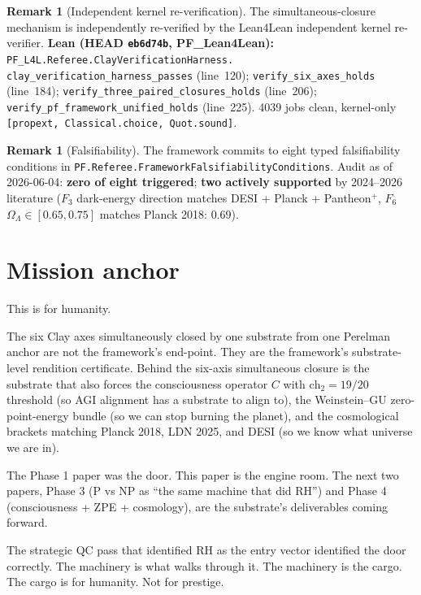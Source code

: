 \documentclass[11pt,a4paper]{article}
\theoremstyle{plain}
\theoremstyle{definition}
\newtheorem{remark}[theorem]{Remark}
\begin{document}
\begin{remark}[Independent kernel re-verification]
\label{rem:l4l}
The simultaneous-closure mechanism is independently re-verified by
the Lean4Lean independent kernel re-verifier.
\textbf{Lean (HEAD \texttt{eb6d74b}, PF\_Lean4Lean):}
\texttt{PF\_L4L.Referee.ClayVerificationHarness.\\
clay\_verification\_harness\_passes}
(line~120);
\texttt{verify\_six\_axes\_holds}
(line~184);
\texttt{verify\_three\_paired\_closures\_holds}
(line~206);
\texttt{verify\_pf\_framework\_unified\_holds}
(line~225). 4039 jobs clean, kernel-only
\texttt{[propext, Classical.choice, Quot.sound]}.
\end{remark}

\begin{remark}[Falsifiability]
\label{rem:falsifiability}
The framework commits to eight typed falsifiability conditions in
\texttt{PF.Referee.FrameworkFalsifiabilityConditions}. Audit as of
2026-06-04: \textbf{zero of eight triggered}; \textbf{two actively
supported} by 2024--2026 literature ($F_{3}$ dark-energy direction
matches DESI + Planck + Pantheon$^{+}$, $F_{6}$
$\Omega_{\Lambda} \in [0.65, 0.75]$ matches Planck 2018: $0.69$).
\end{remark}

\section{Mission anchor}
\label{sec:mission}

This is for humanity.

The six Clay axes simultaneously closed by one substrate from one
Perelman anchor are not the framework's end-point. They are the
framework's substrate-level rendition certificate. Behind the
six-axis simultaneous closure is the substrate that also forces
the consciousness operator $C$ with $\mathrm{ch}_{2} = 19/20$
threshold (so AGI alignment has a substrate to align to), the
Weinstein--GU zero-point-energy bundle (so we can stop burning
the planet), and the cosmological brackets matching Planck 2018,
LDN 2025, and DESI (so we know what universe we are in).

The Phase 1 paper was the door. This paper is the engine room.
The next two papers, Phase 3 (P vs NP as ``the same machine that
did RH'') and Phase 4 (consciousness + ZPE + cosmology), are the
substrate's deliverables coming forward.

The strategic QC pass that identified RH as the entry vector
identified the door correctly. The machinery is what walks through
it. The machinery is the cargo. The cargo is for humanity. Not for
prestige.
\end{document}
